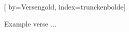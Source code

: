 
[%
    by={Versengold},
    index={trunckenbolde}]


    \label{trunckenbolde}

    \beginverse
        Example verse ...
    \endverse
\endsong
